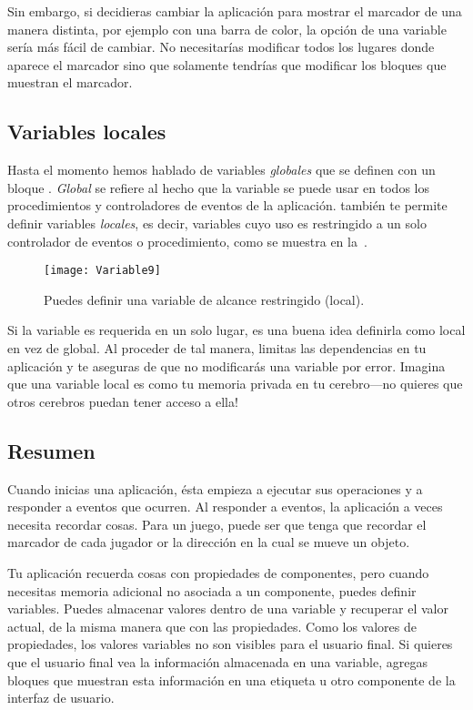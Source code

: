 Sin embargo, si decidieras cambiar la aplicación para mostrar el
marcador de una manera distinta, por ejemplo con una barra de color,
la opción de una variable sería más fácil de cambiar. No necesitarías
modificar todos los lugares donde aparece el marcador sino que
solamente tendrías que modificar los bloques que muestran el marcador.

\subsection*{Variables locales}

Hasta el momento hemos hablado de variables \emph{globales} que se
definen con un bloque . \emph{Global} se
refiere al hecho que la variable se puede usar en todos los
procedimientos y controladores de eventos de la
aplicación. \AppInventor también te permite definir variables
\emph{locales}, es decir, variables cuyo uso es restringido a un solo
controlador de eventos o procedimiento, como se muestra en
la~.

\begin{figure}[H]
\centering
\texttt{[image: Variable9]}
\caption{Puedes definir una variable de alcance restringido (local).}
\label{fig:Variable9}
\end{figure}

Si la variable es requerida en un solo lugar, es una buena idea
definirla como local en vez de global. Al proceder de tal manera,
limitas las dependencias en tu aplicación y te aseguras de que no
modificarás una variable por error. Imagina que una variable local es
como tu memoria privada en tu cerebro---no quieres que otros cerebros
puedan tener acceso a ella!

\subsection*{Resumen}

Cuando inicias una aplicación, ésta empieza a ejecutar sus operaciones
y a responder a eventos que ocurren. Al responder a eventos, la
aplicación a veces necesita recordar cosas. Para un juego, puede ser
que tenga que recordar el marcador de cada jugador or la dirección en
la cual se mueve un objeto.

Tu aplicación recuerda cosas con propiedades de componentes, pero
cuando necesitas memoria adicional no asociada a un componente, puedes
definir variables. Puedes almacenar valores dentro de una variable y
recuperar el valor actual, de la misma manera que con las
propiedades. Como los valores de propiedades, los valores variables no
son visibles para el usuario final. Si quieres que el usuario final
vea la información almacenada en una variable, agregas bloques que
muestran esta información en una etiqueta u otro componente de la
interfaz de usuario.

